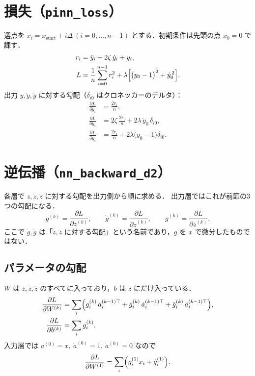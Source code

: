 \documentclass[a4paper,11pt]{ltjsarticle}
\newcommand{\code}[1]{\texttt{#1}}
\begin{document}
\section{損失（\code{pinn\_loss}）}

選点を $x_i=x_{\mathrm{start}}+i\Delta\ (i=0,\dots,n-1)$ とする．初期条件は先頭の点 $x_0=0$ で課す．
\begin{align}
  r_i &= \ddot y_i+2\zeta\,\dot y_i+y_i, \\
  L &= \frac{1}{n}\sum_{i=0}^{n-1}r_i^2
       +\lambda\Bigl[\bigl(y_0-1\bigr)^2+\dot y_0^{\,2}\Bigr].
\end{align}
出力 $y,\dot y,\ddot y$ に対する勾配（$\delta_{i0}$ はクロネッカーのデルタ）：
\begin{align}
  \frac{\partial L}{\partial \ddot y_i} &= \frac{2r_i}{n}, \\
  \frac{\partial L}{\partial \dot y_i}  &= 2\zeta\,\frac{2r_i}{n}+2\lambda\,\dot y_0\,\delta_{i0}, \\
  \frac{\partial L}{\partial y_i}       &= \frac{2r_i}{n}+2\lambda\bigl(y_0-1\bigr)\delta_{i0}.
\end{align}

\section{逆伝播（\code{nn\_backward\_d2}）}

各層で $z,\dot z,\ddot z$ に対する勾配を出力側から順に求める．
出力層ではこれが前節の3つの勾配になる．
\begin{equation}
  g^{(k)}=\frac{\partial L}{\partial z^{(k)}},\qquad
  \dot g^{(k)}=\frac{\partial L}{\partial \dot z^{(k)}},\qquad
  \ddot g^{(k)}=\frac{\partial L}{\partial \ddot z^{(k)}}.
\end{equation}
ここで $\dot g,\ddot g$ は「$\dot z,\ddot z$ に対する勾配」という名前であり，$g$ を $x$ で微分したものではない．

\subsection{パラメータの勾配}
$W$ は $z,\dot z,\ddot z$ のすべてに入っており，$b$ は $z$ にだけ入っている．
\begin{align}
  \frac{\partial L}{\partial W^{(k)}} &= \sum_{i}\Bigl(
      g_i^{(k)}\,a_i^{(k-1)\top}
     +\dot g_i^{(k)}\,\dot a_i^{(k-1)\top}
     +\ddot g_i^{(k)}\,\ddot a_i^{(k-1)\top}\Bigr), \\
  \frac{\partial L}{\partial b^{(k)}} &= \sum_i g_i^{(k)}.
\end{align}
入力層では $a^{(0)}=x,\ \dot a^{(0)}=1,\ \ddot a^{(0)}=0$ なので
\begin{equation}
  \frac{\partial L}{\partial W^{(1)}}=\sum_i\Bigl(g_i^{(1)}x_i+\dot g_i^{(1)}\Bigr).
\end{equation}
\end{document}
